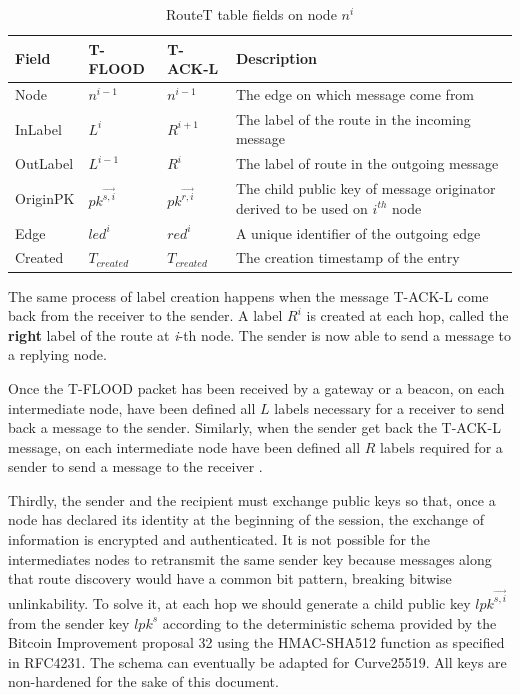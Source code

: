 \documentclass[12pt,oneside]{wlscirep}
\DeclareRobustCommand{\kder}[1]{{\overrightarrow{{#1}}}}
\begin{document}
\begin{table}[ht]
\begin{tabularx}{\textwidth}{lllX}
\toprule
Field & {\scriptsize T-FLOOD} & {\scriptsize T-ACK-L} & Description \\ \midrule
Node & $n^{i-1}$ & $n^{i-1}$ & The edge on which message come from \\
InLabel & $L^i$ & $R^{i+1}$ & The label of the route in the incoming message \\
OutLabel & $L^{i-1}$ & $R^i$ & The label of route in the outgoing message \\
OriginPK & $pk^\kder{s,i}$ & $pk^\kder{r,i}$ & The child public key of message originator   derived to be used on $i^{th}$ node \\
Edge & $led^i$ & $red^i$ & A unique identifier of the outgoing edge \\
Created & $T_{created}$ & $T_{created}$ & The creation timestamp of the entry    \\ \bottomrule
\end{tabularx}
\caption{RouteT table fields on node $n^i$}
\label{RouteT}
\end{table}

The same process of label creation happens when the message T-ACK-L come back from the receiver to the sender. A label $R^i$ is created at each hop, called the \textbf{right} label of the route at \textit{i}-th node. The sender is now able to send a message to a replying node.\par
Once the T-FLOOD packet has been received by a gateway or a beacon, on each intermediate node, have been defined all $L$ labels necessary for a receiver to send back a message to the sender. Similarly, when the sender get back the T-ACK-L message, on each intermediate node have been defined all $R$  labels required for a sender to send a message to the receiver .\par

Thirdly, the sender and the recipient must exchange public keys so that, once a node has declared its identity at the beginning of the session, the exchange of information is encrypted and authenticated. It is not possible for the intermediates nodes to retransmit the same sender key because messages along that route discovery would have a common bit pattern, breaking bitwise unlinkability. To solve it, at each hop we should generate a child public key $lpk^\kder{s, i}$ from the sender key $lpk^s$ according to the deterministic schema provided by the Bitcoin Improvement proposal 32\citep{BIP:32} using the HMAC-SHA512 function as specified in RFC4231\cite{RFC:4231}. The schema can eventually be adapted for Curve25519\cite{7966967}. All keys are non-hardened for the sake of this document. \par
\end{document}
